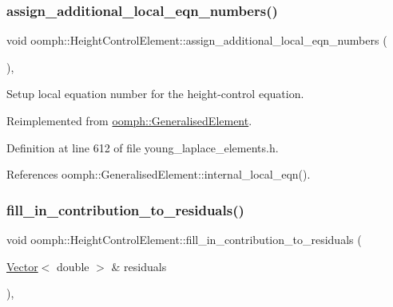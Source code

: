 \subsubsection{\texorpdfstring{assign\+\_\+additional\+\_\+local\+\_\+eqn\+\_\+numbers()}{assign\_additional\_local\_eqn\_numbers()}}
{\footnotesize\ttfamily void oomph\+::\+Height\+Control\+Element\+::assign\+\_\+additional\+\_\+local\+\_\+eqn\+\_\+numbers (\begin{DoxyParamCaption}{ }\end{DoxyParamCaption})\hspace{0.3cm}{\ttfamily [inline]}, {\ttfamily [virtual]}}



Setup local equation number for the height-\/control equation. 



Reimplemented from \hyperlink{classoomph_1_1GeneralisedElement_a4cdd0d1eef33b43f652c8f0b9e43967b}{oomph\+::\+Generalised\+Element}.



Definition at line 612 of file young\+\_\+laplace\+\_\+elements.\+h.



References oomph\+::\+Generalised\+Element\+::internal\+\_\+local\+\_\+eqn().

\mbox{\label{classoomph_1_1HeightControlElement_a4b60627344a4a3d6647aabc994059d9d}} 
\subsubsection{\texorpdfstring{fill\+\_\+in\+\_\+contribution\+\_\+to\+\_\+residuals()}{fill\_in\_contribution\_to\_residuals()}}
{\footnotesize\ttfamily void oomph\+::\+Height\+Control\+Element\+::fill\+\_\+in\+\_\+contribution\+\_\+to\+\_\+residuals (\begin{DoxyParamCaption}\item[{\hyperlink{classoomph_1_1Vector}{Vector}$<$ double $>$ \&}]{residuals }\end{DoxyParamCaption})\hspace{0.3cm}{\ttfamily [inline]}, {\ttfamily [virtual]}}



